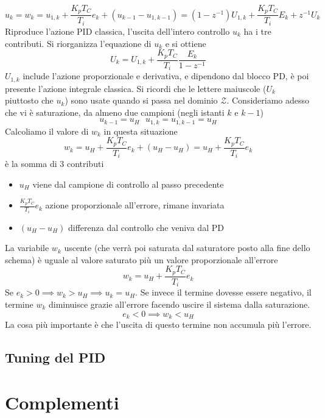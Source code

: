 \documentclass[10pt, letterpaper]{report}
\begin{document}
$$ u_k=w_k=u_{1,k}+\frac{K_pT_C}{T_i}e_k+(u_{k-1}-u_{1,k-1})=(1-z^{-1})U_{1,k}+\frac{K_pT_C}{T_i}E_k+z^{-1}U_k$$
Riproduce l'azione PID classica, l'uscita dell'intero controllo $u_k$ ha i tre contributi. Si riorganizza l'equazione di $u_k$ e si ottiene 
$$ U_k=U_{1,k}+\frac{K_pT_C}{T_i}\frac{E_k}{1-z^{-1}}$$
$U_{1,k}$ include l'azione proporzionale e derivativa, e dipendono dal blocco PD, è poi presente l'azione integrale classica. Si ricordi che le lettere maiuscole ($U_k$ piuttosto che $u_k$) sono usate quando si passa nel dominio $\mathcal{Z}$.\acc 
Consideriamo adesso che vi è saturazione, da almeno due campioni (negli istanti $k$ e $k-1$)
 $$u_{k-1}=u_H \ \ \ u_{1,k}=u_{1,k-1}=u_H $$
Calcoliamo il valore di $w_k$ in questa situazione 
$$ 
w_k=u_H+\frac{K_pT_C}{T_i}e_k+(u_H-u_H)=u_H+\frac{K_pT_C}{T_i}e_k
$$
è la somma di 3 contributi\begin{itemize}
    \item $u_H$ viene dal campione di controllo al passo precedente
    \item $\frac{K_pT_C}{T_i}e_k$ azione proporzionale all'errore, rimane invariata
    \item $(u_H-u_H)$ differenza dal controllo che veniva dal PD
\end{itemize}
La variabile $w_k$ uscente (che verrà poi saturata dal saturatore posto alla fine dello schema) è uguale al valore saturato più un valore proporzionale all'errore 
$$ 
w_k=u_H+\frac{K_pT_C}{T_i}e_k
$$
Se $e_k>0\implies w_k>u_H\implies u_k = u_H$. Se invece il termine dovesse essere negativo, il termine $w_k$ diminuisce grazie all'errore facendo uscire il sistema dalla saturazione. 
$$ e_k<0\implies w_k<u_H$$
La cosa più importante è che l'uscita di questo termine non accumula più l'errore.
\flowerLine 
\section{Tuning del PID}
















\chapter{Complementi}
\end{document}
